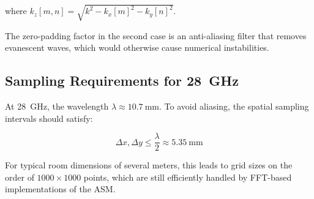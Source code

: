 \documentclass[12pt,a4paper]{article}
\begin{document}
where $k_z[m,n] = \sqrt{k^2 - k_x[m]^2 - k_y[n]^2}$.

The zero-padding factor in the second case is an anti-aliasing filter that removes evanescent waves, which would otherwise cause numerical instabilities.

\subsection{Sampling Requirements for \SI{28}{\giga\hertz}}

At \SI{28}{\giga\hertz}, the wavelength $\lambda \approx \SI{10.7}{\milli\meter}$. To avoid aliasing, the spatial sampling intervals should satisfy:

\begin{equation}
    \Delta x, \Delta y \leq \frac{\lambda}{2} \approx \SI{5.35}{\milli\meter}
\end{equation}

For typical room dimensions of several meters, this leads to grid sizes on the order of $1000 \times 1000$ points, which are still efficiently handled by FFT-based implementations of the ASM.
\end{document}
